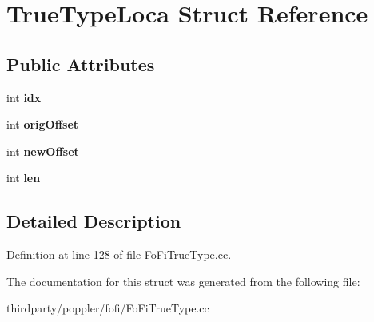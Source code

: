 \hypertarget{struct_true_type_loca}{}\section{True\+Type\+Loca Struct Reference}
\label{struct_true_type_loca}
\subsection*{Public Attributes}
\begin{DoxyCompactItemize}
\item 
\mbox{\label{struct_true_type_loca_a299105c7c0b2f30b90dc8b17096544e5}} 
int {\bfseries idx}
\item 
\mbox{\label{struct_true_type_loca_aaadb2ca3cca8a745180875026aae72de}} 
int {\bfseries orig\+Offset}
\item 
\mbox{\label{struct_true_type_loca_a890cd917d2bb7f3ccd47f11d7049be94}} 
int {\bfseries new\+Offset}
\item 
\mbox{\label{struct_true_type_loca_a8032de3acc89417420bd3fd50b04cb39}} 
int {\bfseries len}
\end{DoxyCompactItemize}


\subsection{Detailed Description}


Definition at line 128 of file Fo\+Fi\+True\+Type.\+cc.



The documentation for this struct was generated from the following file\+:\begin{DoxyCompactItemize}
\item 
thirdparty/poppler/fofi/Fo\+Fi\+True\+Type.\+cc\end{DoxyCompactItemize}
